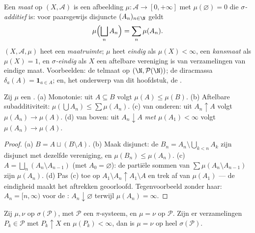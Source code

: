 \begin{definition}\label{def:b3:measure:measure}
Een \emph{maat} op $(X, \mathcal A)$ is een
afbeelding $\mu \colon \mathcal A \to [0, +\infty]$ met
$\mu(\varnothing) = 0$ die \emph{$\sigma$-additief} is: voor
paarsgewijs disjuncte $(A_n)_{n\in\N}$ geldt
\[
\mu\Bigl(\bigsqcup_n A_n\Bigr) = \sum_n \mu(A_n).
\]
$(X, \mathcal A, \mu)$ heet een \emph{maatruimte}; $\mu$ heet
\emph{eindig} als $\mu(X) < \infty$, een \emph{kansmaat} als
$\mu(X) = 1$, en \emph{$\sigma$-eindig} als $X$ een aftelbare
vereniging is van verzamelingen van eindige maat. Voorbeelden: de
telmaat op $(\N, \mathcal P(\N))$; de diracmassa $\delta_a(A) =
\mathbf 1_{a \in A}$; en, het onderwerp van dit hoofdstuk, de
.
\end{definition}

\begin{proposition}\label{prop:b3:measure:basics}
Zij $\mu$ een . (a) Monotonie: uit $A \subseteq B$ volgt
$\mu(A) \leq \mu(B)$. (b) Aftelbare subadditiviteit:
$\mu(\bigcup A_n) \leq \sum\mu(A_n)$. (c)  van
onderen: uit $A_n \uparrow A$ volgt $\mu(A_n) \to \mu(A)$. (d)
 van boven: uit $A_n \downarrow A$ \emph{met $\mu(A_1)
< \infty$} volgt $\mu(A_n) \to \mu(A)$.
\end{proposition}

\begin{proof}
(a) $B = A \sqcup (B\setminus A)$. (b) Maak disjunct: de $B_n =
A_n \setminus \bigcup_{k<n}A_k$ zijn disjunct met dezelfde
vereniging, en $\mu(B_n) \leq \mu(A_n)$. (c) $A = \bigsqcup_n (A_n
\setminus A_{n-1})$ (met $A_0 = \varnothing$): de partiële sommen
van $\sum\mu(A_n\setminus A_{n-1})$ zijn $\mu(A_n)$. (d) Pas (c)
toe op $A_1 \setminus A_n \uparrow A_1 \setminus A$ en trek af van
$\mu(A_1)$ --- de eindigheid maakt het aftrekken geoorloofd.
Tegenvoorbeeld zonder haar: $A_n = [n, \infty)$ voor de
: $A_n \downarrow \varnothing$ terwijl $\mu(A_n) =
\infty$.
\end{proof}

\begin{theorem}[Eenduidigheid]\label{thm:b3:measure:uniqueness}
Zij $\mu, \nu$  op $\sigma(\mathcal P)$, met $\mathcal P$ een
$\pi$-systeem, en $\mu = \nu$ op $\mathcal P$. Zijn er
verzamelingen $P_k \in \mathcal P$ met $P_k \uparrow X$ en
$\mu(P_k) < \infty$, dan is $\mu = \nu$ op heel
$\sigma(\mathcal P)$.
\end{theorem}

